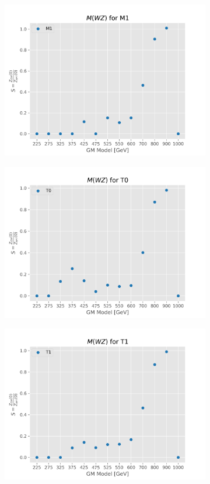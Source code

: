 \documentclass[../Bachelorarbeit.tex]{subfiles}
\begin{document}
\begin{figure}[h]
\begin{subfigure}{0.45\textwidth}
        \includegraphics[width=\textwidth]{Plots/gm_relevanze/MTWZ_op_M1.png}
    \end{subfigure}
    \begin{subfigure}{0.45\textwidth}
        \includegraphics[width=\textwidth]{Plots/gm_relevanze/MTWZ_op_T0.png}
    \end{subfigure}
    \begin{subfigure}{0.45\textwidth}
        \includegraphics[width=\textwidth]{Plots/gm_relevanze/MTWZ_op_T1.png}

\end{subfigure}
\end{figure}
\end{document}
